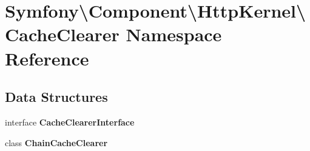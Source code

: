 \section{Symfony\textbackslash{}Component\textbackslash{}Http\+Kernel\textbackslash{}Cache\+Clearer Namespace Reference}
\label{namespace_symfony_1_1_component_1_1_http_kernel_1_1_cache_clearer}
\subsection*{Data Structures}
\begin{DoxyCompactItemize}
\item 
interface {\bf Cache\+Clearer\+Interface}
\item 
class {\bf Chain\+Cache\+Clearer}
\end{DoxyCompactItemize}
